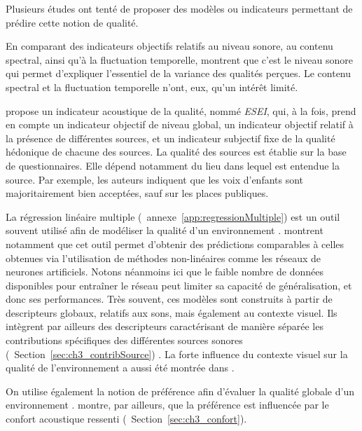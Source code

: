  
Plusieurs études ont tenté de proposer des modèles ou indicateurs permettant de prédire cette notion de qualité.

En comparant des indicateurs objectifs relatifs au niveau sonore, au contenu spectral, ainsi qu'à la fluctuation temporelle, \citep{nilsson2006soundscape,nilsson2007acoustic} montrent que c'est le niveau sonore qui permet d'expliquer l'essentiel de la variance des qualités perçues. Le contenu spectral et la fluctuation temporelle n'ont, eux, qu'un intérêt limité.

\citep{garcia2012validation} propose un indicateur acoustique de la qualité, nommé \emph{ESEI}, qui, à la fois, prend en compte un indicateur objectif de niveau global, un indicateur objectif relatif à la présence de différentes sources, et un indicateur subjectif fixe de la qualité hédonique de chacune des sources. La qualité des sources est établie sur la base de questionnaires. Elle dépend notamment du lieu dans lequel est entendue la source. Par exemple, les auteurs indiquent que les voix d'enfants sont majoritairement bien acceptées, sauf sur les places publiques.

La régression linéaire multiple (\cf~annexe~\ref{app:regressionMultiple}) est un outil souvent utilisé afin de modéliser la qualité d'un environnement \citep{ricciardi2015sound}. \citep{brocolini2012prediction} montrent notamment que cet outil permet d'obtenir des prédictions comparables à celles obtenues via l'utilisation de méthodes non-linéaires comme les réseaux de neurones artificiels. Notons néanmoins ici que le faible nombre de données disponibles pour entraîner le réseau peut limiter sa capacité de généralisation, et donc ses performances. Très souvent, ces modèles sont construits à partir de descripteurs globaux, relatifs aux sons, mais également au contexte visuel. Ils intègrent par ailleurs des descripteurs caractérisant de manière séparée les contributions spécifiques des différentes sources sonores (\cf~Section~\ref{sec:ch3_contribSource}) \citep{ricciardi2015sound,brocolini2012prediction}. La forte influence du contexte visuel sur la qualité de l'environnement a aussi été montrée dans \citep{hong2013designing}.

On utilise également la notion de préférence afin d'évaluer la qualité globale d'un environnement \citep{yu2010factors}. \citep{hong2013designing} montre, par ailleurs, que la préférence est influencée par le confort acoustique ressenti (\cf~Section~\ref{sec:ch3_confort}).\\


